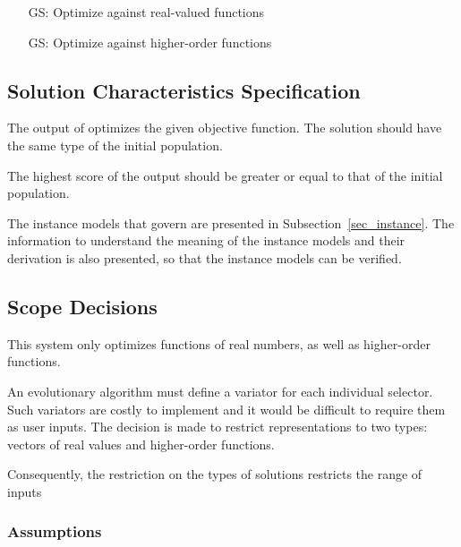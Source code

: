 \documentclass[12pt]{article}
\newcounter{goalnum} %
\begin{document}
\begin{itemize}

\item[GS\refstepcounter{goalnum}\thegoalnum \label{GS_REALS}:] Optimize against real-valued functions
\item[GS\refstepcounter{goalnum}\thegoalnum \label{GS_HIGHER}:] Optimize against higher-order functions
\end{itemize}

\subsection{Solution Characteristics Specification}
\label{subsec:solchar}

The output of \thisproject{} optimizes the given objective function. The solution should have the same type of the initial population.

The highest score of the output should be greater or equal to that of the initial population.


The instance models that govern \progname{} are presented in
Subsection~\ref{sec_instance}.  The information to understand the meaning of the
instance models and their derivation is also presented, so that the instance
models can be verified.

\subsection{Scope Decisions}
\label{subsec:scope}

This system only optimizes functions of real numbers, as well as higher-order functions.

An evolutionary algorithm must define a variator for each individual selector. Such variators are costly to implement and it would be difficult to require them as user inputs. The decision is made to restrict representations to two types: vectors of real values and higher-order functions. 

Consequently, the restriction on the types of solutions restricts the range of inputs


\subsubsection{Assumptions} \label{sec_assumpt}
\end{document}
